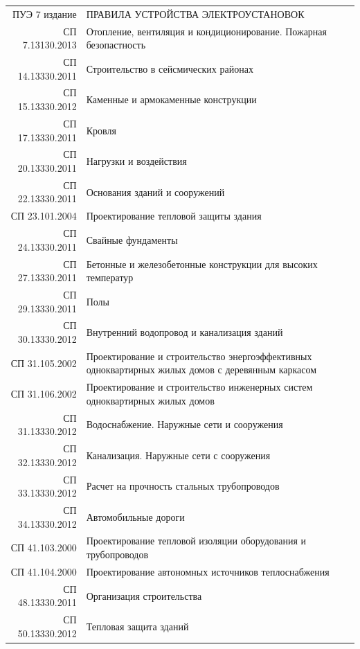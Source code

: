 \documentclass[10pt, twocolumn]{report}
\begin{document}
\begin{tabular}{rp{14cm}}
ПУЭ 7 издание    & ПРАВИЛА УСТРОЙСТВА ЭЛЕКТРОУСТАНОВОК \\
СП 7.13130.2013  & Отопление, вентиляция и кондиционирование. Пожарная безопастность \\
СП 14.13330.2011 & Строительство в сейсмических районах \\
СП 15.13330.2012 & Каменные и армокаменные конструкции \\
СП 17.13330.2011 & Кровля \\
СП 20.13330.2011 & Нагрузки и воздействия \\
СП 22.13330.2011 & Основания зданий и сооружений \\
СП 23.101.2004   & Проектирование тепловой защиты здания \\
СП 24.13330.2011 & Свайные фундаменты \\
СП 27.13330.2011 & Бетонные и железобетонные конструкции для высоких температур \\
СП 29.13330.2011 & Полы \\
СП 30.13330.2012 & Внутренний водопровод и канализация зданий \\
СП 31.105.2002   & Проектирование и строительство энергоэффективных одноквартирных жилых домов с деревянным каркасом \\
СП 31.106.2002   & Проектирование и строительство инженерных систем одноквартирных жилых домов \\
СП 31.13330.2012 & Водоснабжение. Наружные сети и сооружения \\
СП 32.13330.2012 & Канализация. Наружные сети с сооружения \\
СП 33.13330.2012 & Расчет на прочность стальных трубопроводов \\
СП 34.13330.2012 & Автомобильные дороги \\
СП 41.103.2000   & Проектирование тепловой изоляции оборудования и трубопроводов \\
СП 41.104.2000   & Проектирование автономных источников теплоснабжения \\
СП 48.13330.2011 & Организация строительства \\
СП 50.13330.2012 & Тепловая защита зданий \\
\end{tabular}
\end{document}
